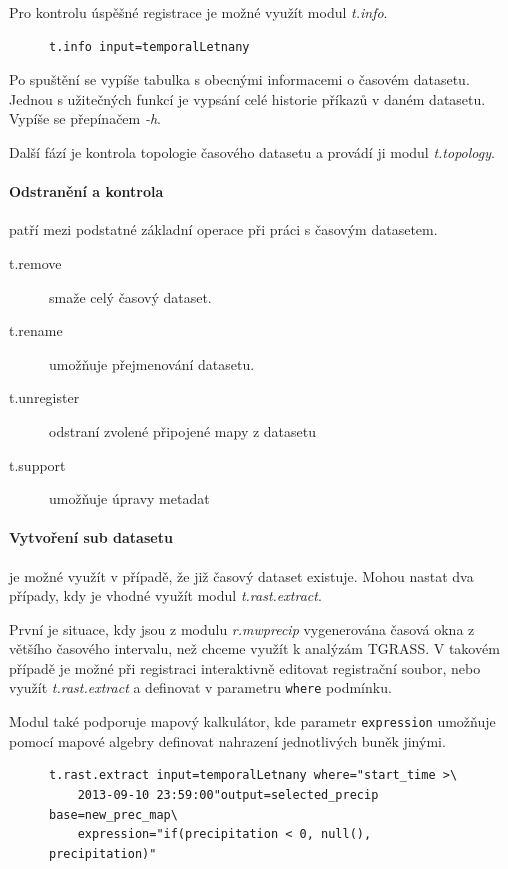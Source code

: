 \documentclass[a4paper,12pt,oneside]{report}
\begin{document}
Pro kontrolu úspěšné registrace je možné využít modul \textit{t.info}.
\begin{figure}[h!]
\begin{footnotesize}
\lstset{extendedchars=false,
escapeinside=''}
\begin{lstlisting}[style=mybash]
t.info input=temporalLetnany      
\end{lstlisting}
\end{footnotesize} 
\end{figure}

Po spuštění se vypíše tabulka s obecnými informacemi o časovém
datasetu. Jednou s užitečných funkcí je vypsání celé historie příkazů
v daném datasetu. Vypíše se přepínačem \emph{-h}.

Další fází je kontrola topologie časového datasetu a provádí ji modul
\textit{t.topology}.

\paragraph*{Odstranění a kontrola} patří mezi podstatné základní operace při práci s časovým datasetem.
\begin{description}
\item[t.remove] smaže celý časový dataset.  
\item[t.rename] umožňuje  přejmenování datasetu.
\item[t.unregister] odstraní zvolené připojené mapy z datasetu
\item[t.support] umožňuje úpravy metadat
\end{description}


\paragraph*{Vytvoření sub datasetu} je možné využít v případě, že již
časový dataset existuje. Mohou nastat dva případy, kdy je vhodné
využít modul \textit{t.rast.extract}.

První je situace, kdy jsou z modulu \textit{r.mwprecip} vygenerována
časová okna z většího časového intervalu, než chceme využít k analýzám
TGRASS. V takovém případě je možné při registraci interaktivně
editovat registrační soubor, nebo využít \textit{t.rast.extract} a
definovat v parametru \texttt{where} podmínku.

Modul také podporuje mapový kalkulátor, kde parametr
\texttt{expression} umožňuje pomocí mapové algebry definovat nahrazení
jednotlivých buněk jinými.
\begin{figure}[h!]
\begin{footnotesize}
\lstset{extendedchars=false,
escapeinside=''}
\begin{lstlisting}[style=mybash]
t.rast.extract input=temporalLetnany where="start_time >\ 
    2013-09-10 23:59:00"output=selected_precip base=new_prec_map\
    expression="if(precipitation < 0, null(), precipitation)" 
\end{lstlisting}
\end{footnotesize} 
\end{figure}
\end{document}
